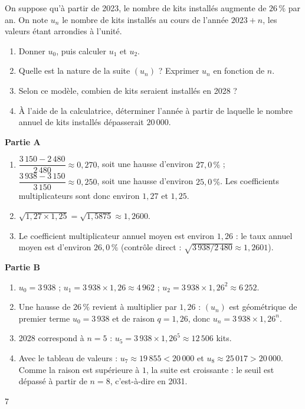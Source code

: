 {On suppose qu'à partir de 2023, le nombre de kits installés augmente de $26\,\%$ par an. On note $u_n$ le nombre de kits installés au cours de l'année $2023+n$, les valeurs étant arrondies à l'unité.
\begin{enumerate}
\item Donner $u_0$, puis calculer $u_1$ et $u_2$.
\item Quelle est la nature de la suite $(u_n)$ ? Exprimer $u_n$ en fonction de $n$.
\item Selon ce modèle, combien de kits seraient installés en 2028 ?
\item À l'aide de la calculatrice, déterminer l'année à partir de laquelle le nombre annuel de kits installés dépasserait $20\,000$.
\end{enumerate}
}{%
\textbf{Partie A}
\begin{enumerate}
\item $\dfrac{3\,150-2\,480}{2\,480}\approx0{,}270$, soit une hausse d'environ $27{,}0\,\%$ ; $\dfrac{3\,938-3\,150}{3\,150}\approx0{,}250$, soit une hausse d'environ $25{,}0\,\%$. Les coefficients multiplicateurs sont donc environ $1{,}27$ et $1{,}25$.
\item $\sqrt{1{,}27\times1{,}25}=\sqrt{1{,}5875}\approx1{,}2600$.
\item Le coefficient multiplicateur annuel moyen est environ $1{,}26$ : le taux annuel moyen est d'environ $26{,}0\,\%$ (contrôle direct : $\sqrt{3\,938/2\,480}\approx1{,}2601$).
\end{enumerate}
\textbf{Partie B}
\begin{enumerate}
\item $u_0=3\,938$ ; $u_1=3\,938\times1{,}26\approx4\,962$ ; $u_2=3\,938\times1{,}26^2\approx6\,252$.
\item Une hausse de $26\,\%$ revient à multiplier par $1{,}26$ : $(u_n)$ est géométrique de premier terme $u_0=3\,938$ et de raison $q=1{,}26$, donc $u_n=3\,938\times1{,}26^n$.
\item 2028 correspond à $n=5$ : $u_5=3\,938\times1{,}26^5\approx12\,506$ kits.
\item Avec le tableau de valeurs : $u_7\approx19\,855<20\,000$ et $u_8\approx25\,017>20\,000$. Comme la raison est supérieure à $1$, la suite est croissante : le seuil est dépassé à partir de $n=8$, c'est-à-dire en 2031.
\end{enumerate}
}{7}

